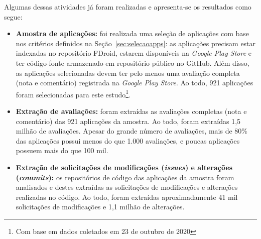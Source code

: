 Algumas dessas atividades já foram realizadas e apresenta-se os resultados como segue:
\begin{itemize}
 \item \textbf{Amostra de aplicações: } foi realizada uma seleção de aplicações com base nos critérios definidos na Seção~\ref{sec:selecaoapps}: as aplicações precisam estar indexadas no repositório FDroid, estarem disponíveis na \textit{Google Play Store} e ter código-fonte armazenado em repositório público no GitHub. Além disso, as aplicações selecionadas devem ter pelo menos uma avaliação completa (nota e comentário) registrada na \textit{Google Play Store}. Ao todo, 921 aplicações foram selecionadas para este estudo\footnote{Com base em dados coletados em 23 de outubro de 2020}.
 
 \item \textbf{Extração de avaliações: } foram extraídas as avaliações completas (nota e comentário) das 921 aplicações da amostra. Ao todo, foram extraídas 1,5 milhão de avaliações. Apesar do grande número de avaliações, mais de 80\% das aplicações possui menos do que 1.000 avaliações, e poucas aplicações possuem mais do que 100 mil.
 
 \item \textbf{Extração de solicitações de modificações (\textit{issues}) e alterações (\textit{commits}): } os repositórios de código das aplicações da amostra foram analisados e destes extraídas as solicitações de modificações e alterações realizadas no código. Ao todo, foram extraídas aproximadamente 41 mil solicitações de modificações e 1,1 milhão de alterações.

  
\end{itemize}



